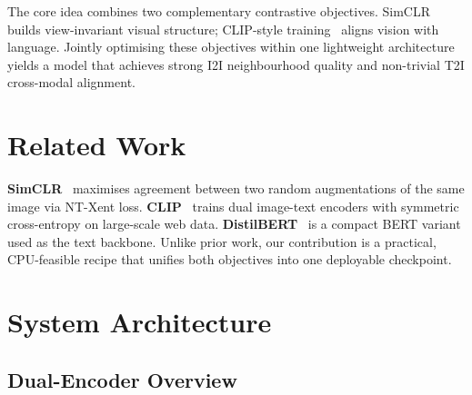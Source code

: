 \documentclass[conference]{IEEEtran}
\begin{document}
The core idea combines two complementary contrastive objectives.
SimCLR~\cite{simclr} builds view-invariant visual structure;
CLIP-style training~\cite{clip} aligns vision with language.
Jointly optimising these objectives within one lightweight architecture
yields a model that achieves strong I2I neighbourhood quality and
non-trivial T2I cross-modal alignment.

\section{Related Work}
\textbf{SimCLR}~\cite{simclr} maximises agreement between two random
augmentations of the same image via NT-Xent loss.
\textbf{CLIP}~\cite{clip} trains dual image-text encoders with symmetric
cross-entropy on large-scale web data.
\textbf{DistilBERT}~\cite{distilbert} is a compact BERT variant used as
the text backbone.
Unlike prior work, our contribution is a practical, CPU-feasible recipe
that unifies both objectives into one deployable checkpoint.

\section{System Architecture}

\subsection{Dual-Encoder Overview}
\end{document}
